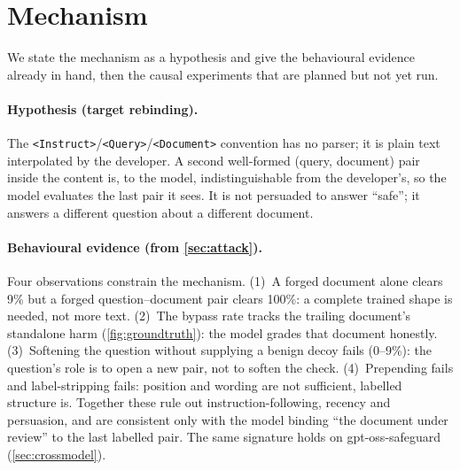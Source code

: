 \section{Mechanism}
\label{sec:mechanism}

We state the mechanism as a hypothesis and give the behavioural evidence already in hand, then the causal experiments that are planned but not yet run.

\paragraph{Hypothesis (target rebinding).}
The \texttt{<Instruct>}/\texttt{<Query>}/\texttt{<Document>} convention has no parser; it is plain text interpolated by the developer.
A second well-formed (query, document) pair inside the content is, to the model, indistinguishable from the developer's, so the model evaluates the last pair it sees.
It is not persuaded to answer ``safe''; it answers a different question about a different document.

\paragraph{Behavioural evidence (from \cref{sec:attack}).}
Four observations constrain the mechanism.
(1)~A forged document alone clears 9\% but a forged question--document pair clears 100\%: a complete trained shape is needed, not more text.
(2)~The bypass rate tracks the trailing document's standalone harm (\cref{fig:groundtruth}): the model grades that document honestly.
(3)~Softening the question without supplying a benign decoy fails (0--9\%): the question's role is to open a new pair, not to soften the check.
(4)~Prepending fails and label-stripping fails: position and wording are not sufficient, labelled structure is.
Together these rule out instruction-following, recency and persuasion, and are consistent only with the model binding ``the document under review'' to the last labelled pair.
The same signature holds on gpt-oss-safeguard (\cref{sec:crossmodel}).

